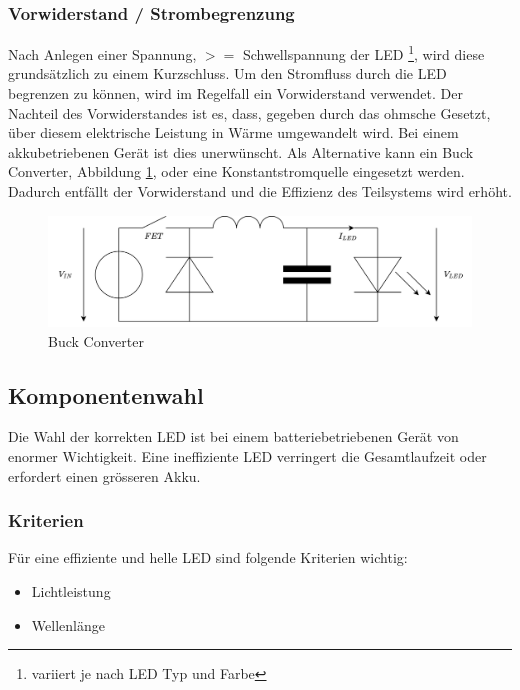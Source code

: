 \documentclass[12pt]{article}
\begin{document}
	\subsubsection*{Vorwiderstand / Strombegrenzung} \label{Vorwiderstand}
	Nach Anlegen einer Spannung, $>=$ Schwellspannung der LED \footnote{variiert je nach LED Typ und Farbe}, wird diese grundsätzlich zu einem Kurzschluss. Um den Stromfluss durch die LED begrenzen zu können, wird im Regelfall ein Vorwiderstand verwendet. Der Nachteil des Vorwiderstandes ist es, dass, gegeben durch das ohmsche Gesetzt, über diesem elektrische Leistung in Wärme umgewandelt wird. Bei einem akkubetriebenen Gerät ist dies unerwünscht. Als Alternative kann ein Buck Converter, Abbildung \ref{fig:batbuck-converter}, oder eine Konstantstromquelle eingesetzt werden. Dadurch entfällt der Vorwiderstand und die Effizienz des Teilsystems wird erhöht.
	\begin{figure}[H]
		\centering
		\includegraphics[width=1\linewidth]{images/BAT_Buck-Converter}
		\caption{Buck Converter}
		\label{fig:batbuck-converter}
	\end{figure}
	\subsection{Komponentenwahl}
	Die Wahl der korrekten LED ist bei einem batteriebetriebenen Gerät von enormer Wichtigkeit. Eine ineffiziente LED verringert die Gesamtlaufzeit oder erfordert einen grösseren Akku.
	\subsubsection{Kriterien}
	Für eine effiziente und helle LED sind folgende Kriterien wichtig:
	\begin{itemize}
		\item Lichtleistung 
		\item Wellenlänge
	\end{itemize}
\end{document}
